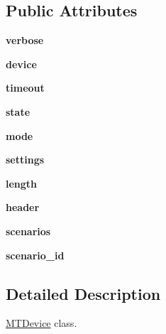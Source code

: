 \subsection*{Public Attributes}
\begin{DoxyCompactItemize}
\item 
\mbox{\label{classmtdevice_1_1MTDevice_a6dcc0bc56086e927423db95656856d10}} 
{\bfseries verbose}
\item 
\mbox{\label{classmtdevice_1_1MTDevice_af9445fdb0f702410f2bf23d69c92efa5}} 
{\bfseries device}
\item 
\mbox{\label{classmtdevice_1_1MTDevice_a91c1ae6fa1d5d15044bba922e42ceafb}} 
{\bfseries timeout}
\item 
\mbox{\label{classmtdevice_1_1MTDevice_ac50a29b63d176b4261060d50d1758e32}} 
{\bfseries state}
\item 
\mbox{\label{classmtdevice_1_1MTDevice_ab24f4baabcc6525727f9f4c5dee1e226}} 
{\bfseries mode}
\item 
\mbox{\label{classmtdevice_1_1MTDevice_a11283b18b5ced9424dc73efe03a49fd8}} 
{\bfseries settings}
\item 
\mbox{\label{classmtdevice_1_1MTDevice_a9b8218f5a01b92e698ac428ea481c948}} 
{\bfseries length}
\item 
\mbox{\label{classmtdevice_1_1MTDevice_aeced4192f195e40e5c3d2bee968f0fd7}} 
{\bfseries header}
\item 
\mbox{\label{classmtdevice_1_1MTDevice_a194a8ba29c60bf12b87b5927b0aed098}} 
{\bfseries scenarios}
\item 
\mbox{\label{classmtdevice_1_1MTDevice_a4bab15bccdddcdf12e08c34926b2c03c}} 
{\bfseries scenario\+\_\+id}
\end{DoxyCompactItemize}


\subsection{Detailed Description}
\hyperlink{classmtdevice_1_1MTDevice}{M\+T\+Device} class. 

